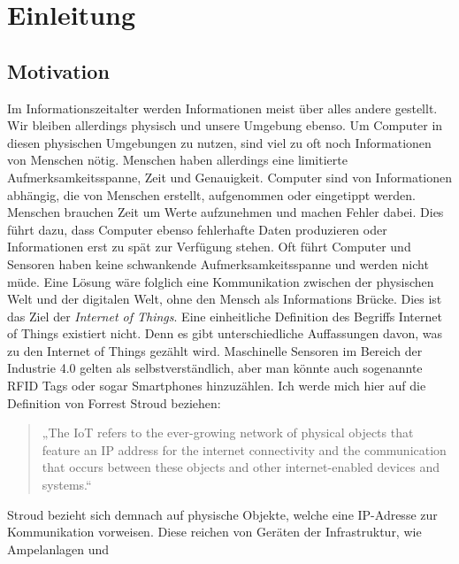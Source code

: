 \chapter{Einleitung}

\section{Motivation}
Im Informationszeitalter werden Informationen meist über alles andere gestellt. Wir bleiben allerdings physisch und unsere Umgebung ebenso. Um Computer in diesen physischen Umgebungen zu nutzen, sind viel zu oft noch Informationen von Menschen nötig. Menschen haben allerdings eine limitierte Aufmerksamkeitsspanne, Zeit und Genauigkeit. Computer sind von Informationen abhängig, die von Menschen erstellt, aufgenommen oder eingetippt werden. Menschen brauchen Zeit um Werte aufzunehmen und machen Fehler dabei. Dies führt dazu, dass Computer ebenso fehlerhafte Daten produzieren oder Informationen erst zu spät zur Verfügung stehen. Oft führt 
Computer und Sensoren haben keine schwankende Aufmerksamkeitsspanne und werden nicht müde. Eine Lösung wäre folglich eine Kommunikation zwischen der physischen Welt und der digitalen Welt, ohne den Mensch als Informations Brücke. Dies ist das Ziel der \textit{Internet of Things}. Eine einheitliche Definition des Begriffs Internet of Things existiert nicht. Denn es gibt unterschiedliche Auffassungen davon, was zu den Internet of Things gezählt wird. Maschinelle Sensoren im Bereich der Industrie 4.0 gelten als selbstverständlich, aber man könnte auch sogenannte RFID Tags oder sogar Smartphones hinzuzählen. Ich werde mich hier auf die Definition von Forrest Stroud beziehen: 
\begin{quote}
„The IoT refers to the ever-growing network of physical objects that feature an IP address for the internet connectivity and the communication that occurs between these objects and other internet-enabled devices and systems.“ 
\end{quote}
Stroud bezieht sich demnach auf physische Objekte, welche eine IP-Adresse zur Kommunikation vorweisen. Diese reichen von Geräten der Infrastruktur, wie Ampelanlagen und 

